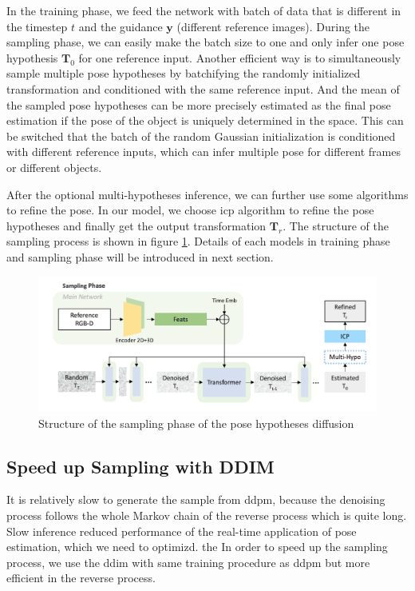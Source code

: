 \documentclass[12pt,DIV14,BCOR12mm,a4paper,footinclude=false,headinclude,parskip=half-,twoside,openright,cleardoublepage=empty,toc=index,bibliography=totoc,listof=totoc]{scrreprt}
\numberwithin{equation}{chapter}
\begin{document}
In the training phase, we feed the network with batch of data that is different in the timestep $t$ and the guidance $\mathbf{y}$ (different reference images). During the sampling phase, we can easily make the batch size to one and only infer one pose hypothesis $\mathbf{T}_{0}$ for one reference input. Another efficient way is to simultaneously sample multiple pose hypotheses by batchifying the randomly initialized transformation and conditioned with the same reference input. And the mean of the sampled pose hypotheses can be more precisely estimated as the final pose estimation if the pose of the object is uniquely determined in the space. This can be switched that the batch of the random Gaussian initialization is conditioned with different reference inputs, which can infer multiple pose for different frames or different objects.

After the optional multi-hypotheses inference, we can further use some algorithms to refine the pose. In our model, we choose \gls{icp}\cite{121791} algorithm to refine the pose hypotheses and finally get the output transformation $\mathbf{T}_{r}$. The structure of the sampling process is shown in figure \ref{img:sample}. Details of each models in training phase and sampling phase will be introduced in next section.
\begin{figure}[h]
	\centering
	\includegraphics[scale=.235]{img/sample.png}
	\caption{Structure of the sampling phase of the pose hypotheses diffusion}
	\label{img:sample}
\end{figure}

\subsection{Speed up Sampling with DDIM}
It is relatively slow to generate the sample from \gls{ddpm}, because the denoising process follows the whole Markov chain of the reverse process which is quite long. Slow inference reduced performance of the real-time application of pose estimation, which we need to optimizd. the In order to speed up the sampling process, we use the \gls{ddim} \cite{song2022denoising} with same training procedure as \gls{ddpm} but more efficient in the reverse process.
\end{document}
